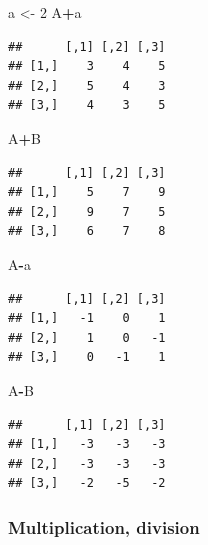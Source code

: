 \documentclass[
  11pt,
]{book}
\newenvironment{Shaded}{\begin{snugshade}}{\end{snugshade}}
\newcommand{\DecValTok}[1]{\textcolor[rgb]{0.00,0.00,0.81}{#1}}
\newcommand{\NormalTok}[1]{#1}
\newcommand{\OperatorTok}[1]{\textcolor[rgb]{0.81,0.36,0.00}{\textbf{#1}}}
\newcommand{\StringTok}[1]{\textcolor[rgb]{0.31,0.60,0.02}{#1}}
\numberwithin{equation}{section}
\numberwithin{countremarque}{section}
\begin{document}
\begin{Shaded}
\begin{Highlighting}[]
\NormalTok{a \textless{}{-}}\StringTok{ }\DecValTok{2}
\NormalTok{A}\OperatorTok{+}\NormalTok{a}
\end{Highlighting}
\end{Shaded}

\begin{lstlisting}
##      [,1] [,2] [,3]
## [1,]    3    4    5
## [2,]    5    4    3
## [3,]    4    3    5
\end{lstlisting}

\begin{Shaded}
\begin{Highlighting}[]
\NormalTok{A}\OperatorTok{+}\NormalTok{B}
\end{Highlighting}
\end{Shaded}

\begin{lstlisting}
##      [,1] [,2] [,3]
## [1,]    5    7    9
## [2,]    9    7    5
## [3,]    6    7    8
\end{lstlisting}

\begin{Shaded}
\begin{Highlighting}[]
\NormalTok{A}\OperatorTok{{-}}\NormalTok{a}
\end{Highlighting}
\end{Shaded}

\begin{lstlisting}
##      [,1] [,2] [,3]
## [1,]   -1    0    1
## [2,]    1    0   -1
## [3,]    0   -1    1
\end{lstlisting}

\begin{Shaded}
\begin{Highlighting}[]
\NormalTok{A}\OperatorTok{{-}}\NormalTok{B}
\end{Highlighting}
\end{Shaded}

\begin{lstlisting}
##      [,1] [,2] [,3]
## [1,]   -3   -3   -3
## [2,]   -3   -3   -3
## [3,]   -2   -5   -2
\end{lstlisting}

\hypertarget{multiplication-division}{%
\subsubsection{Multiplication, division}\label{multiplication-division}}
\end{document}

